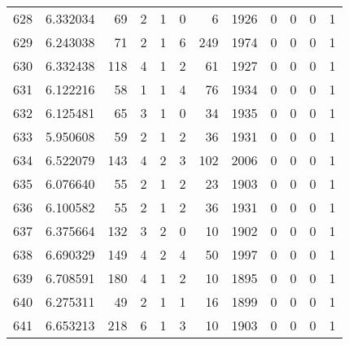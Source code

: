 \begin{tabular}{lrrrrrrrrrrr}
628 &  6.332034 &   69 &      2 &        1 &      0 &               6 &  1926 &               0 &               0 &               0 &               1 \\
629 &  6.243038 &   71 &      2 &        1 &      6 &             249 &  1974 &               0 &               0 &               0 &               1 \\
630 &  6.332438 &  118 &      4 &        1 &      2 &              61 &  1927 &               0 &               0 &               0 &               1 \\
631 &  6.122216 &   58 &      1 &        1 &      4 &              76 &  1934 &               0 &               0 &               0 &               1 \\
632 &  6.125481 &   65 &      3 &        1 &      0 &              34 &  1935 &               0 &               0 &               0 &               1 \\
633 &  5.950608 &   59 &      2 &        1 &      2 &              36 &  1931 &               0 &               0 &               0 &               1 \\
634 &  6.522079 &  143 &      4 &        2 &      3 &             102 &  2006 &               0 &               0 &               0 &               1 \\
635 &  6.076640 &   55 &      2 &        1 &      2 &              23 &  1903 &               0 &               0 &               0 &               1 \\
636 &  6.100582 &   55 &      2 &        1 &      2 &              36 &  1931 &               0 &               0 &               0 &               1 \\
637 &  6.375664 &  132 &      3 &        2 &      0 &              10 &  1902 &               0 &               0 &               0 &               1 \\
638 &  6.690329 &  149 &      4 &        2 &      4 &              50 &  1997 &               0 &               0 &               0 &               1 \\
639 &  6.708591 &  180 &      4 &        1 &      2 &              10 &  1895 &               0 &               0 &               0 &               1 \\
640 &  6.275311 &   49 &      2 &        1 &      1 &              16 &  1899 &               0 &               0 &               0 &               1 \\
641 &  6.653213 &  218 &      6 &        1 &      3 &              10 &  1903 &               0 &               0 &               0 &               1 \\

\end{tabular}
